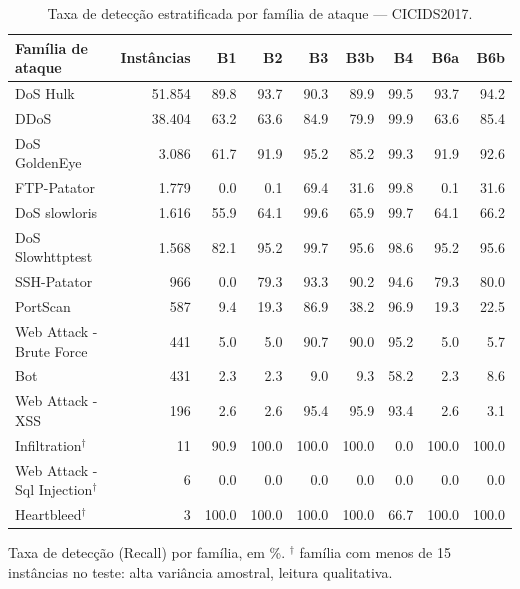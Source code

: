 \begin{table}[htbp]
\centering
\caption{Taxa de detecção estratificada por família de ataque — CICIDS2017.}
\label{tab:recall-estratificado-cicids2017}
\small
\begin{tabular}{lrrrrrrrr}
\hline
Família de ataque & Instâncias & B1 & B2 & B3 & B3b & B4 & B6a & B6b \\
\hline
DoS Hulk & 51.854 & 89.8 & 93.7 & 90.3 & 89.9 & 99.5 & 93.7 & 94.2 \\
DDoS & 38.404 & 63.2 & 63.6 & 84.9 & 79.9 & 99.9 & 63.6 & 85.4 \\
DoS GoldenEye & 3.086 & 61.7 & 91.9 & 95.2 & 85.2 & 99.3 & 91.9 & 92.6 \\
FTP-Patator & 1.779 & 0.0 & 0.1 & 69.4 & 31.6 & 99.8 & 0.1 & 31.6 \\
DoS slowloris & 1.616 & 55.9 & 64.1 & 99.6 & 65.9 & 99.7 & 64.1 & 66.2 \\
DoS Slowhttptest & 1.568 & 82.1 & 95.2 & 99.7 & 95.6 & 98.6 & 95.2 & 95.6 \\
SSH-Patator & 966 & 0.0 & 79.3 & 93.3 & 90.2 & 94.6 & 79.3 & 80.0 \\
PortScan & 587 & 9.4 & 19.3 & 86.9 & 38.2 & 96.9 & 19.3 & 22.5 \\
Web Attack - Brute Force & 441 & 5.0 & 5.0 & 90.7 & 90.0 & 95.2 & 5.0 & 5.7 \\
Bot & 431 & 2.3 & 2.3 & 9.0 & 9.3 & 58.2 & 2.3 & 8.6 \\
Web Attack - XSS & 196 & 2.6 & 2.6 & 95.4 & 95.9 & 93.4 & 2.6 & 3.1 \\
Infiltration$^{\dagger}$ & 11 & 90.9 & 100.0 & 100.0 & 100.0 & 0.0 & 100.0 & 100.0 \\
Web Attack - Sql Injection$^{\dagger}$ & 6 & 0.0 & 0.0 & 0.0 & 0.0 & 0.0 & 0.0 & 0.0 \\
Heartbleed$^{\dagger}$ & 3 & 100.0 & 100.0 & 100.0 & 100.0 & 66.7 & 100.0 & 100.0 \\
\hline
\end{tabular}
\begin{flushleft}\footnotesize Taxa de detecção (Recall) por família, em \%. $^{\dagger}$ família com menos de 15 instâncias no teste: alta variância amostral, leitura qualitativa.\end{flushleft}
\end{table}
